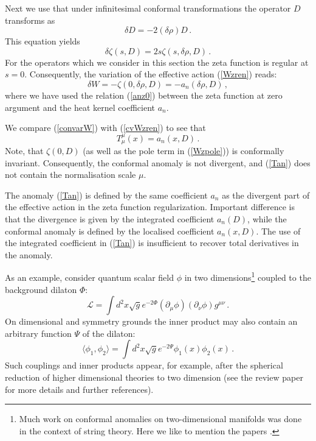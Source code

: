 Next we use that under infinitesimal conformal transformations
the operator $D$ transforms as
\begin{equation}
\delta D=-2(\delta \rho) D \,.\label{infcontraD}
\end{equation}
This equation yields
\begin{equation}
\delta \zeta (s,D) =2s \zeta (s,\delta \rho,D) \,.\label{convarizeta}
\end{equation}
For the operators which we consider in this section the zeta function
is regular at $s=0$. Consequently, the variation of the effective action
(\ref{Wzren}) reads:
\begin{equation}
\delta W=-\zeta (0,\delta\rho,D)=-a_n(\delta\rho,D)\,,
\label{cvWzren}
\end{equation}
where we have used the relation (\ref{anz0}) between the zeta function
at zero argument and the heat kernel coefficient $a_n$. 

We compare (\ref{convarW}) with (\ref{cvWzren}) to see that
\begin{equation}
T_\mu^\mu (x)= a_n(x,D) \,.\label{Tan}
\end{equation}
Note, that $\zeta (0,D)$ (as well as the
pole term in (\ref{Wzpole})) is conformally invariant. 
Consequently, the conformal anomaly is
not divergent, and (\ref{Tan}) does not contain the normalisation
scale $\mu$.

The anomaly (\ref{Tan}) is defined by the same coefficient $a_n$ as the
divergent part of the effective action in the zeta function regularization.
Important difference is that the divergence is given by the integrated
coefficient $a_n(D)$, while the conformal anomaly is defined by the
localised coefficient $a_n(x,D)$. The use of the integrated coefficient in 
(\ref{Tan}) is insufficient to recover total derivatives in the anomaly.  

As an example, consider quantum scalar field $\phi$ 
in two dimensions\footnote{Much work on conformal anomalies
on two-dimensional manifolds was done in the context of string
theory. Here we like to mention the papers 
\cite{Alvarez:1983zi,Friedan:1984xq,Friedan:1985ii,
Callan:1985ia,Alvarez:1987vr}.}
coupled
to the background dilaton $\Phi$:
\begin{equation}
\mathcal{L}=\int d^2x\sqrt{g} e^{-2\Phi} (\partial_\mu\phi)
(\partial_\nu\phi)g^{\mu\nu} \,.\label{nonminact}
\end{equation}
On dimensional and symmetry grounds the inner product may also
contain an arbitrary function $\Psi$ of the dilaton:
\begin{equation}
\langle \phi_1,\phi_2 \rangle =\int d^2x\sqrt{g} e^{-2\Psi}
\phi_1(x)\phi_2(x) \,.\label{dilaprod}
\end{equation} 
Such couplings and inner products appear, for example, after the
spherical reduction of higher dimensional theories to two
dimension (see the review paper \cite{Grumiller:2002nm} for
more details and further references).

